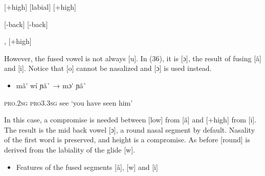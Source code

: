 \begin{styleindexi}
          [+high]          [labial]           [+high]                            
\end{styleindexi}

\begin{styleindexi}
          [-back]                                [-back]
\end{styleindexi}

\begin{styleindexi}
                              [u]  [+round], [+high]
\end{styleindexi}

However, the fused vowel is not always [u]. In (36), it is [ɔ], the result of fusing [ã] and [i]. Notice that [o] cannot be nasalized and [ɔ] is used instead.

\begin{itemize}
\item \begin{styleindexi}
       \label{bkm:Ref476431462}mã\'{}            wí                   ɲã\`{}                →        mɔ\'{}   ɲã\`{} 
\end{styleindexi}\end{itemize}
\begin{styleindexi}
              \textsc{pro.2sg}     \textsc{pro3.3sg}        see                        ‘you have seen him’
\end{styleindexi}

In this case, a compromise is needed between [low] from [ã] and [+high] from [i]. The result is the mid back vowel [ɔ], a round nasal segment by default. Nasality of the first word is preserved, and height is a compromise. As before [round] is derived from the labiality of the glide [w]. 

\begin{itemize}
\item \begin{styleindexi}
  Features of the fused segments [ã], [w] and [i]
\end{styleindexi}\end{itemize}
\begin{styleindexi}
          [ã]                [w]               [i]
\end{styleindexi}

\begin{styleindexi}
          [low]            [labial]         [+high]                            
\end{styleindexi}

